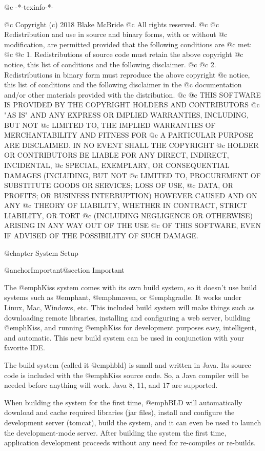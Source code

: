 @c -*-texinfo-*-

@c  Copyright (c) 2018 Blake McBride
@c  All rights reserved.
@c
@c  Redistribution and use in source and binary forms, with or without
@c  modification, are permitted provided that the following conditions are
@c  met:
@c
@c  1. Redistributions of source code must retain the above copyright
@c  notice, this list of conditions and the following disclaimer.
@c
@c  2. Redistributions in binary form must reproduce the above copyright
@c  notice, this list of conditions and the following disclaimer in the
@c  documentation and/or other materials provided with the distribution.
@c
@c  THIS SOFTWARE IS PROVIDED BY THE COPYRIGHT HOLDERS AND CONTRIBUTORS
@c  "AS IS" AND ANY EXPRESS OR IMPLIED WARRANTIES, INCLUDING, BUT NOT
@c  LIMITED TO, THE IMPLIED WARRANTIES OF MERCHANTABILITY AND FITNESS FOR
@c  A PARTICULAR PURPOSE ARE DISCLAIMED. IN NO EVENT SHALL THE COPYRIGHT
@c  HOLDER OR CONTRIBUTORS BE LIABLE FOR ANY DIRECT, INDIRECT, INCIDENTAL,
@c  SPECIAL, EXEMPLARY, OR CONSEQUENTIAL DAMAGES (INCLUDING, BUT NOT
@c  LIMITED TO, PROCUREMENT OF SUBSTITUTE GOODS OR SERVICES; LOSS OF USE,
@c  DATA, OR PROFITS; OR BUSINESS INTERRUPTION) HOWEVER CAUSED AND ON ANY
@c  THEORY OF LIABILITY, WHETHER IN CONTRACT, STRICT LIABILITY, OR TORT
@c  (INCLUDING NEGLIGENCE OR OTHERWISE) ARISING IN ANY WAY OUT OF THE USE
@c  OF THIS SOFTWARE, EVEN IF ADVISED OF THE POSSIBILITY OF SUCH DAMAGE.


@chapter System Setup

@anchor{Important}@section Important

The @emph{Kiss} system comes with its own build system, so it doesn't
use build systems such as @emph{ant}, @emph{maven}, or @emph{gradle}.
It works under Linux, Mac, Windows, etc. This included build system
will make things such as downloading remote libraries, installing and
configuring a web server, building @emph{Kiss}, and running
@emph{Kiss} for development purposes easy, intelligent, and automatic.
This new build system can be used in conjunction with your favorite IDE.

The build system (called it @emph{bld}) is small and written in Java.
Its source code is included with the @emph{Kiss} source code.  So, a
Java compiler will be needed before anything will work.  
Java 8, 11, and 17 are supported.

When building the system for the first time, @emph{BLD} will
automatically download and cache required libraries (jar files), install and
configure the development server (tomcat), build the system, and it
can even be used to launch the development-mode server.  After building
the system the first time, application development proceeds without
any need for re-compiles or re-builds.

